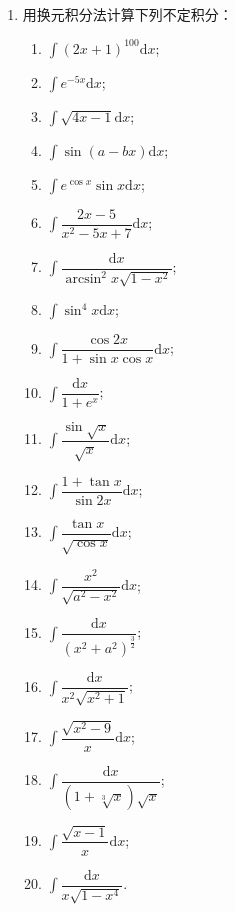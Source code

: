\begin{enumerate}
    \item 用换元积分法计算下列不定积分：
    \begin{enumerate}[(1)]\setlength{\itemsep}{5pt}\setlength{\topsep}{15pt}
        \item $\displaystyle\int (2x+1)^{100}\text{d}x$;
        \item $\displaystyle\int e^{-5x}\text{d}x$;
        \item $\displaystyle\int \sqrt{4x-1}\text{d}x$;
        \item $\displaystyle\int \sin(a-bx)\text{d}x$;
        \item $\displaystyle\int e^{\cos x}\sin x\text{d}x$;
        \item $\displaystyle\int \dfrac{2x-5}{x^2-5x+7}\text{d}x$;
        \item $\displaystyle\int \dfrac{\text{d}x}{\arcsin^2x\sqrt{1-x^2}}$;
        \item $\displaystyle\int \sin^4x\text{d}x$;
        \item $\displaystyle\int \dfrac{\cos 2x}{1+\sin x\cos x}\text{d}x$;
        \item $\displaystyle\int \dfrac{\text{d}x}{1+e^x}$;
        \item $\displaystyle\int \dfrac{\sin\sqrt{x}}{\sqrt{x}}\text{d}x$;
        \item $\displaystyle\int \dfrac{1+\tan x}{\sin 2x}\text{d}x$;
        \item $\displaystyle\int \dfrac{\tan x}{\sqrt{\cos x}}\text{d}x$;
        \item $\displaystyle\int \dfrac{x^2}{\sqrt{a^2-x^2}}\text{d}x$;
        \item $\displaystyle\int \dfrac{\text{d}x}{(x^2+a^2)^{\frac{3}{2}}}$;
        \item $\displaystyle\int \dfrac{\text{d}x}{x^2\sqrt{x^2+1}}$;
        \item $\displaystyle\int \dfrac{\sqrt{x^2-9}}{x}\text{d}x$;
        \item $\displaystyle\int \dfrac{\text{d}x}{(1+\sqrt[3]{x})\sqrt{x}}$;
        \item $\displaystyle\int \dfrac{\sqrt{x-1}}{x}\text{d}x$;
        \item $\displaystyle\int \dfrac{\text{d}x}{x\sqrt{1-x^4}}$.
    \end{enumerate}


\end{enumerate}

